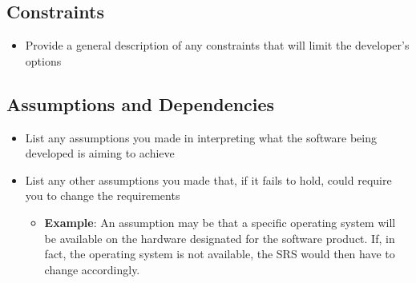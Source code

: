 \documentclass[]{article}
\begin{document}
\subsection{Constraints}
\label{sub:constraints}
\begin{itemize}
	\item Provide a general description of any constraints that will limit the developer's options
\end{itemize}

\subsection{Assumptions and Dependencies}
\label{sub:assumptions_and_dependencies}
\begin{itemize}
	\item List any assumptions you made in interpreting what the software being developed is aiming to achieve
	\item List any other assumptions you made that, if it fails to hold, could require you to change the requirements
	\begin{itemize}
		\item \textbf{Example}: An assumption may be that a specific operating system will be available on the hardware designated for the software product. If, in fact, the operating system is not available, the SRS would then have to change accordingly.
	\end{itemize}
\end{itemize}
\end{document}
